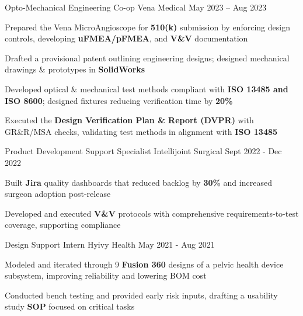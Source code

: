 \documentclass[11pt, a4paper]{russell}
\begin{document}
\begin{cventries}
\cventry
  {Opto-Mechanical Engineering Co-op} %
  {Vena Medical} %
  {} %
  {May 2023 -- Aug 2023} %
  {
    \begin{cvitems}
        \item {Prepared the Vena MicroAngioscope for \textbf{510(k)} submission by enforcing design controls, developing \textbf{uFMEA/pFMEA}, and \textbf{V\&V} documentation}
        \item {Drafted a provisional patent outlining engineering designs; designed mechanical drawings \& prototypes in \textbf{SolidWorks}}
        \item {Developed optical \& mechanical test methods compliant with \textbf{ISO 13485 and ISO 8600}; designed fixtures reducing verification time by \textbf{20\%}}
        \item {Executed the \textbf{Design Verification Plan \& Report (DVPR)} with GR\&R/MSA checks, validating test methods in alignment with \textbf{ISO 13485}}
    \end{cvitems}
  }

\cventry
  {Product Development Support Specialist} %
  {Intellijoint Surgical} %
  {} %
  {Sept 2022 - Dec 2022} %
  {
    \begin{cvitems}
        \item {Built \textbf{Jira} quality dashboards that reduced backlog by \textbf{30\%} and increased surgeon adoption post-release}
        \item {Developed and executed \textbf{V\&V} protocols with comprehensive requirements-to-test coverage, supporting compliance}
    \end{cvitems}
  }

\cventry
  {Design Support Intern} %
  {Hyivy Health} %
  {} %
  {May 2021 - Aug 2021} %
  {
    \begin{cvitems}
        \item {Modeled and iterated through 9 \textbf{Fusion 360} designs of a pelvic health device subsystem, improving reliability and lowering BOM cost}
        \item {Conducted bench testing and provided early risk inputs, drafting a usability study \textbf{SOP} focused on critical tasks}
    \end{cvitems}
  }
\end{cventries}
\end{document}
